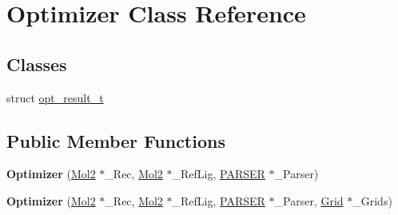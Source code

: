 \hypertarget{classOptimizer}{
\section{Optimizer Class Reference}
\label{classOptimizer}
}
\subsection*{Classes}
\begin{DoxyCompactItemize}
\item 
struct \hyperlink{structOptimizer_1_1opt__result__t}{opt\_\-result\_\-t}
\end{DoxyCompactItemize}
\subsection*{Public Member Functions}
\begin{DoxyCompactItemize}
\item 
\hypertarget{classOptimizer_aa414405d8d2bee0a5a9ed7a57d5e0e48}{
{\bfseries Optimizer} (\hyperlink{classMol2}{Mol2} $\ast$\_\-Rec, \hyperlink{classMol2}{Mol2} $\ast$\_\-RefLig, \hyperlink{classPARSER}{PARSER} $\ast$\_\-Parser)}
\label{classOptimizer_aa414405d8d2bee0a5a9ed7a57d5e0e48}

\item 
\hypertarget{classOptimizer_a1121dce6693ac845a934baf17295ea71}{
{\bfseries Optimizer} (\hyperlink{classMol2}{Mol2} $\ast$\_\-Rec, \hyperlink{classMol2}{Mol2} $\ast$\_\-RefLig, \hyperlink{classPARSER}{PARSER} $\ast$\_\-Parser, \hyperlink{classGrid}{Grid} $\ast$\_\-Grids)}
\label{classOptimizer_a1121dce6693ac845a934baf17295ea71}

\end{DoxyCompactItemize}

